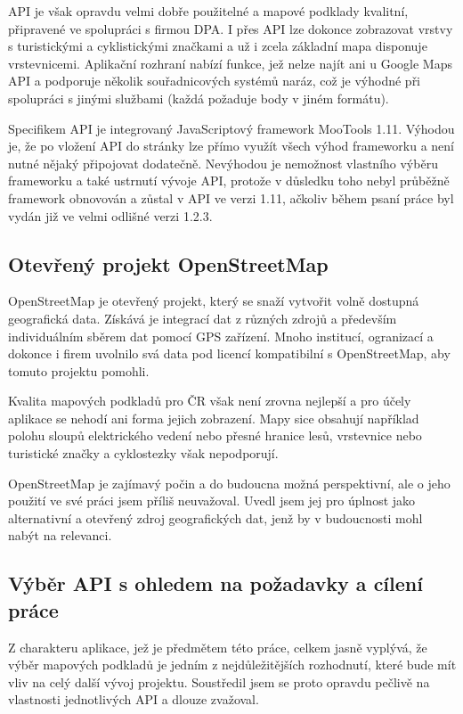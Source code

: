 API je však opravdu velmi dobře použitelné a mapové podklady
kvalitní, připravené ve spolupráci s firmou DPA. I přes API lze
dokonce zobrazovat vrstvy s turistickými a cyklistickými značkami a už i
zcela základní mapa disponuje vrstevnicemi. Aplikační rozhraní nabízí
funkce, jež nelze najít ani u Google Maps API a podporuje několik
souřadnicových systémů naráz, což je výhodné při spolupráci s jinými
službami (každá požaduje body v jiném formátu).

Specifikem API je integrovaný JavaScriptový framework MooTools 1.11.
Výhodou je, že po vložení API do stránky lze přímo využít všech výhod
frameworku a není nutné nějaký připojovat dodatečně. Nevýhodou je
nemožnost vlastního výběru frameworku a také ustrnutí vývoje API,
protože v důsledku toho nebyl průběžně framework obnovován a zůstal
v API ve verzi 1.11, ačkoliv během psaní práce byl vydán již ve
velmi odlišné verzi 1.2.3.

\subsection{Otevřený projekt OpenStreetMap}
OpenStreetMap je otevřený projekt, který se snaží vytvořit volně
dostupná geografická data. Získává je integrací dat z různých zdrojů
a především individuálním sběrem dat pomocí GPS zařízení. Mnoho
institucí, ogranizací a dokonce i firem uvolnilo svá data pod licencí
kompatibilní s OpenStreetMap, aby tomuto projektu pomohli.

Kvalita mapových podkladů pro ČR však není zrovna nej\-lepší a
pro účely aplikace se nehodí ani forma jejich zobrazení. Mapy sice
obsahují například polohu sloupů elektrického vedení nebo přesné
hranice lesů, vrstevnice nebo turistické značky a cyklostezky však
nepodporují.

OpenStreetMap je zajímavý počin a do budoucna možná perspektivní, ale
o jeho použití ve své práci jsem příliš neuvažoval. Uvedl jsem jej
pro úplnost jako alternativní a otevřený zdroj geografických dat,
jenž by v budoucnosti mohl nabýt na relevanci.

\subsection{Výběr API s ohledem na požadavky a cílení
práce}\label{vybranamapa}
Z charakteru aplikace, jež je předmětem této práce, celkem jasně
vyplývá, že výběr mapových podkladů je jedním z nej\-důležitějších
rozhodnutí, které bude mít vliv na celý další vývoj projektu.
Soustředil jsem se proto opravdu pečlivě na vlastnosti
jednotlivých API a dlouze zvažoval.

